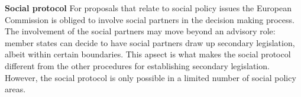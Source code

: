 \textbf{Social protocol}
For proposals that relate to social policy issues the European Commission is obliged to involve social partners in the decision making process. The involvement of the social partners may move beyond an advisory role: member states can decide to have social partners draw up secondary legislation, albeit within certain boundaries. This apsect is what makes the social protocol different from the other procedures for establishing secondary legislation. However, the social protocol is only possible in a limited number of social policy areas. 